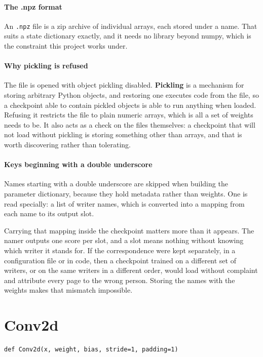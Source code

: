 \paragraph{The .npz format}
An \texttt{.npz} file is a zip archive of individual arrays, each stored under a name. That suits a state dictionary exactly, and it needs no library beyond numpy, which is the constraint this project works under.


\paragraph{Why pickling is refused}
The file is opened with object pickling disabled. \textbf{Pickling} is a mechanism for storing arbitrary Python objects, and restoring one executes code from the file, so a checkpoint able to contain pickled objects is able to run anything when loaded. Refusing it restricts the file to plain numeric arrays, which is all a set of weights needs to be. It also acts as a check on the files themselves: a checkpoint that will not load without pickling is storing something other than arrays, and that is worth discovering rather than tolerating.


\paragraph{Keys beginning with a double underscore}
Names starting with a double underscore are skipped when building the parameter dictionary, because they hold metadata rather than weights. One is read specially: a list of writer names, which is converted into a mapping from each name to its output slot.

Carrying that mapping inside the checkpoint matters more than it appears. The namer outputs one score per slot, and a slot means nothing without knowing which writer it stands for. If the correspondence were kept separately, in a configuration file or in code, then a checkpoint trained on a different set of writers, or on the same writers in a different order, would load without complaint and attribute every page to the wrong person. Storing the names with the weights makes that mismatch impossible.


\section{Conv2d}
\begin{lstlisting}[style=sig]
def Conv2d(x, weight, bias, stride=1, padding=1)
\end{lstlisting}

